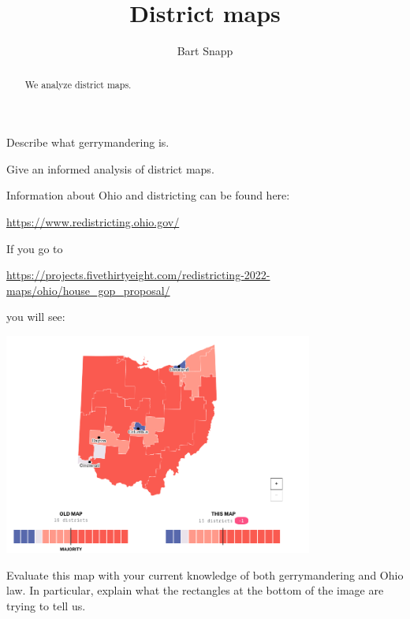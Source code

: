 \documentclass[noauthor,nooutcomes,hints,handout]{ximera}
\title{District maps}
\author{Bart Snapp}
\begin{document}
\begin{abstract}
  We analyze district maps.
\end{abstract}
\maketitle

\begin{listOutcomes}
\item Describe what gerrymandering is.
\item Give an informed analysis of district maps.
\end{listOutcomes}

Information about Ohio and districting can be found here:
\begin{center}
  \url{https://www.redistricting.ohio.gov/}
\end{center}


\mynewpage






\begin{question}
    If you go to
  \begin{center}
  \url{https://projects.fivethirtyeight.com/redistricting-2022-maps/ohio/house_gop_proposal/}
  \end{center}
  you will see:
  \begin{center}
    \includegraphics[width=4in]{houseGOP.png}
  \end{center}
  Evaluate this map with your current knowledge of both gerrymandering
  and Ohio law. In particular, explain what the rectangles at the
  bottom of the image are trying to tell us.
\end{question}




\mynewpage
\end{document}
